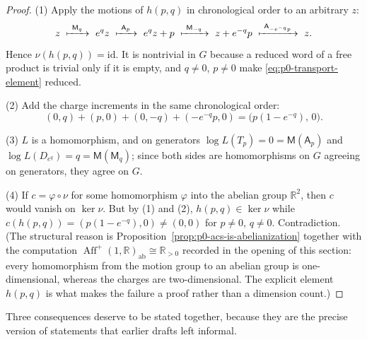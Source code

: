 \begin{proof}
(1) Apply the motions of $h(p,q)$ in chronological order to an arbitrary $z$:
\[
  z\ \xmapsto{\ \mathsf M_q\ }\ e^{q}z
    \ \xmapsto{\ \mathsf A_p\ }\ e^{q}z+p
    \ \xmapsto{\ \mathsf M_{-q}\ }\ z+e^{-q}p
    \ \xmapsto{\ \mathsf A_{-e^{-q}p}\ }\ z .
\]
Hence $\nu(h(p,q))=\mathrm{id}$.  It is nontrivial in $G$ because a reduced word
of a free product is trivial only if it is empty, and $q\ne0$, $p\ne0$ make
\eqref{eq:p0-transport-element} reduced.

(2) Add the charge increments in the same chronological order:
\[
  (0,q)+(p,0)+(0,-q)+(-e^{-q}p,0)=\bigl(p(1-e^{-q}),\,0\bigr).
\]

(3) $L$ is a homomorphism, and on generators $\log L(T_p)=0=\mathsf M(\mathsf A_p)$
and $\log L(D_{e^{q}})=q=\mathsf M(\mathsf M_q)$; since both sides are
homomorphisms on $G$ agreeing on generators, they agree on $G$.

(4) If $c=\varphi\circ\nu$ for some homomorphism $\varphi$ into the abelian group
$\mathbb R^2$, then $c$ would vanish on $\ker\nu$.  But by (1) and (2),
$h(p,q)\in\ker\nu$ while $c(h(p,q))=(p(1-e^{-q}),0)\ne(0,0)$ for $p\ne0$,
$q\ne0$.  Contradiction.  (The structural reason is
Proposition~\ref{prop:p0-acs-is-abelianization} together with the computation
$\operatorname{Aff}^{+}(1,\mathbb R)_{\mathrm{ab}}\cong\mathbb R_{>0}$ recorded
in the opening of this section: every homomorphism from the motion group to an
abelian group is one-dimensional, whereas the charges are two-dimensional.  The
explicit element $h(p,q)$ is what makes the failure a proof rather than a
dimension count.)
\end{proof}

Three consequences deserve to be stated together, because they are the precise
version of statements that earlier drafts left informal.


